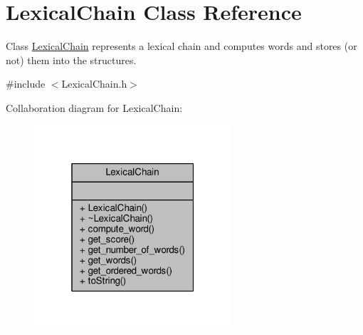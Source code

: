 \hypertarget{classLexicalChain}{}\section{Lexical\+Chain Class Reference}
\label{classLexicalChain}


Class \hyperlink{classLexicalChain}{Lexical\+Chain} represents a lexical chain and computes words and stores (or not) them into the structures.  




{\ttfamily \#include $<$Lexical\+Chain.\+h$>$}



Collaboration diagram for Lexical\+Chain\+:
\nopagebreak
\begin{figure}[H]
\begin{center}
\leavevmode
\includegraphics[width=208pt]{classLexicalChain__coll__graph}
\end{center}
\end{figure}
